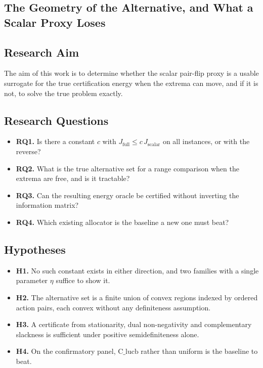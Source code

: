\subsection{The Geometry of the Alternative, and What a Scalar Proxy Loses}

\subsection{Research Aim}

The aim of this work is to determine whether the scalar pair-flip proxy is a usable surrogate
for the true certification energy when the extrema can move, and if it is not, to solve the
true problem exactly.

\subsection{Research Questions}

\begin{itemize}
\item \textbf{RQ1.} Is there a constant $c$ with $J_{\mathrm{full}}\le c\,J_{\mathrm{scalar}}$
on all instances, or with the reverse?
\item \textbf{RQ2.} What is the true alternative set for a range comparison when the extrema
are free, and is it tractable?
\item \textbf{RQ3.} Can the resulting energy oracle be certified without inverting the
information matrix?
\item \textbf{RQ4.} Which existing allocator is the baseline a new one must beat?
\end{itemize}

\subsection{Hypotheses}

\begin{itemize}
\item \textbf{H1.} No such constant exists in either direction, and two families with a single
parameter $\eta$ suffice to show it.
\item \textbf{H2.} The alternative set is a finite union of convex regions indexed by ordered
action pairs, each convex without any definiteness assumption.
\item \textbf{H3.} A certificate from stationarity, dual non-negativity and complementary
slackness is sufficient under positive semidefiniteness alone.
\item \textbf{H4.} On the confirmatory panel, $\mathrm{C\_lucb}$ rather than uniform is the
baseline to beat.
\end{itemize}


